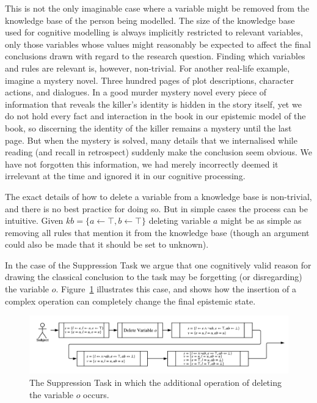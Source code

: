 \documentclass{article}
\begin{document}
This is not the only imaginable case where a variable might be removed from the knowledge base of the person being modelled. The size of the knowledge base used for cognitive modelling is always implicitly restricted to relevant variables, only those variables whose values might reasonably be expected to affect the final conclusions drawn with regard to the research question. Finding which variables and rules are relevant is, however, non-trivial. For another real-life example, imagine a mystery novel. Three hundred pages of plot descriptions, character actions, and dialogues. In a good murder mystery novel every piece of information that reveals the killer's identity is hidden in the story itself, yet we do not hold every fact and interaction in the book in our epistemic model of the book, so discerning the identity of the killer remains a mystery until the last page. But when the mystery is solved, many details that we internalised while reading (and recall in retrospect) suddenly make the conclusion seem obvious. We have not forgotten this information, we had merely incorrectly deemed it irrelevant at the time and ignored it in our cognitive processing.

The exact details of how to delete a variable from a knowledge base is non-trivial, and there is no best practice for doing so. But in simple cases the process can be intuitive. Given $kb=\{a\leftarrow\top, b\leftarrow \top\}$ deleting variable $a$ might be as simple as removing all rules that mention it from the knowledge base (though an argument could also be made that it should be set to unknown).

In the case of the Suppression Task we argue that one cognitively valid reason for drawing the classical conclusion to the task may be forgetting (or disregarding) the variable $o$. Figure~\ref{fig:supmod} illustrates this case, and shows how the insertion of a complex operation can completely change the final epistemic state.

\begin{figure}
\begin{center}
\includegraphics[scale=0.7]{suppressionSCP_mod}
\end{center}

\caption{The Suppression Task in which the additional operation of deleting the variable $o$ occurs.}
\label{fig:supmod}
\end{figure}
\end{document}
